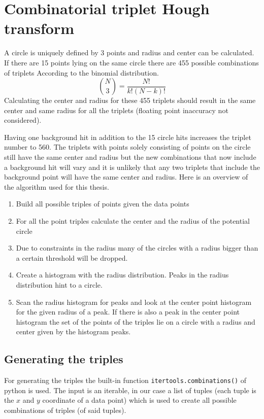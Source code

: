 \documentclass[11pt,twoside]{scrreprt}
\begin{document}
\section{Combinatorial triplet Hough transform}
\label{sec:combinatorial_approach}
A circle is uniquely defined by 3 points and radius and center can be calculated. If there are 15 points lying on the same circle there are 455 possible combinations of triplets According to the binomial distribution.
\[
   \binom{N}{3} = \frac{N!}{k!(N-k)!}
 \] 
Calculating the center and radius for these 455 triplets should result in the same center and same radius for all the triplets (floating point inaccuracy not considered). 

Having one background hit in addition to the 15 circle hits increases the triplet number to 560. The triplets with points solely consisting of points on the circle still have the same center and radius but the new combinations that now include a background hit will vary and it is unlikely that any two triplets that include the background point will have the same center and radius. Here is an overview of the algorithm used for this thesis.

\begin{enumerate}
\item Build all possible triples of points given the data points
\item For all the point triples calculate the center and the radius of the potential circle
\item Due to constraints in the radius many of the circles with a radius bigger than a certain threshold will be dropped.
\item Create a histogram with the radius distribution. Peaks in the radius distribution hint to a circle.
\item Scan the radius histogram for peaks and look at the center point histogram for the given radius of a peak. If there is also a peak in the center point histogram
      the set of the points of the triples lie on a circle with a radius and center given by the histogram peaks.
\end{enumerate}

\subsection{Generating the triples} %
\label{sub:generating_the_triples}
For generating the triples the built-in function \texttt{itertools.combinations()} of python is used. The input is an iterable, in our case a
list of tuples (each tuple is the $x$ and $y$ coordinate of a data point) which is used to create all possible combinations of triples (of said tuples).
\end{document}
